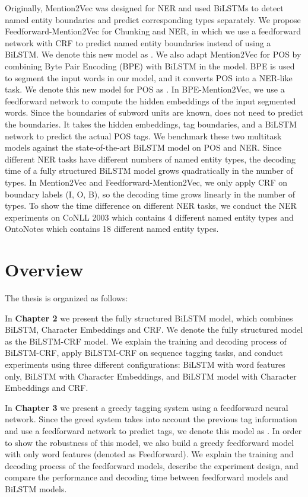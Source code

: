\begin{enumerate}
Originally, Mention2Vec was designed for NER and used BiLSTMs to detect named entity boundaries and predict corresponding types separately. We propose Feedforward-Mention2Vec for Chunking and NER, in which we use a feedforward network with CRF to predict named entity boundaries instead of using a BiLSTM.  We denote this new model as \ma. We also adapt Mention2Vec for POS by combining Byte Pair Encoding (BPE) with BiLSTM in the model. BPE is used to segment the input words in our model, and it converts POS into a NER-like task. We denote this new model for POS as \mb. In BPE-Mention2Vec, we use a feedforward network to compute the hidden embeddings of the input segmented words. Since the boundaries of subword units are known, \mb{} does not need to predict the boundaries. It takes the hidden embeddings, tag boundaries, and a BiLSTM network to predict the actual POS tags. We benchmark these two multitask models against the state-of-the-art BiLSTM model on POS and NER. Since different NER tasks have different numbers of named entity types, the decoding time of a fully structured BiLSTM model grows quadratically in the number of types. In Mention2Vec and Feedforward-Mention2Vec, we only apply CRF on boundary labels (I, O, B), so the decoding time grows linearly in the number of types. To show the time difference on different NER tasks, we conduct the NER experiments on CoNLL 2003 which contains 4 different named entity types and OntoNotes which contains 18 different named entity types.

\end{enumerate}


\section{Overview}
The thesis is organized as follows:

In \textbf{Chapter 2} we present the fully structured BiLSTM model, which combines BiLSTM, Character Embeddings and CRF. We denote the fully structured model as the BiLSTM-CRF model. We explain the training and decoding process of BiLSTM-CRF, apply BiLSTM-CRF on sequence tagging tasks, and conduct experiments using three different configurations: BiLSTM with word features only, BiLSTM with Character Embeddings, and BiLSTM model with Character Embeddings and CRF. 

In \textbf{Chapter 3} we present a greedy tagging system using a feedforward neural network. Since the greed system takes into account the previous tag information and use a feedforward network to predict tags, we denote this model as \ffa. In order to show the robustness of this model, we also build a greedy feedforward model with only word features (denoted as Feedforward). We explain the training and decoding process of the feedforward models, describe the experiment design, and compare the performance and decoding time between feedforward models and BiLSTM models.


